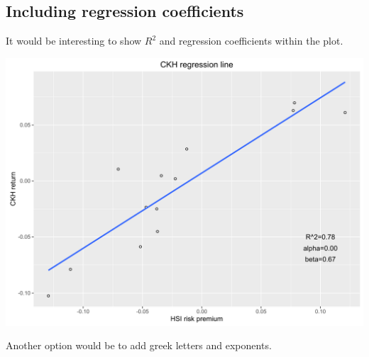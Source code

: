 \subsection{Including regression
coefficients}\label{including-regression-coefficients}

It would be interesting to show \(R^2\) and regression coefficients
within the plot.

\begin{Shaded}
\begin{Highlighting}[]
\StringTok{ }\StringTok{ }\NormalTok{(}\NormalTok{, }\NormalTok{, }\NormalTok{-}\NormalTok{, } \NormalTok{) +}\StringTok{ }
\StringTok{       }\NormalTok{(}\NormalTok{, }\NormalTok{, }\NormalTok{-}\NormalTok{, } \NormalTok{) +}\StringTok{ }
\StringTok{       }\NormalTok{(}\NormalTok{, }\NormalTok{, }\NormalTok{-}\NormalTok{, } \NormalTok{)}
\end{Highlighting}
\end{Shaded}

\begin{center}\includegraphics[width=0.55\linewidth]{figures/lr_10-1} \end{center}

Another option would be to add greek letters and exponents.

